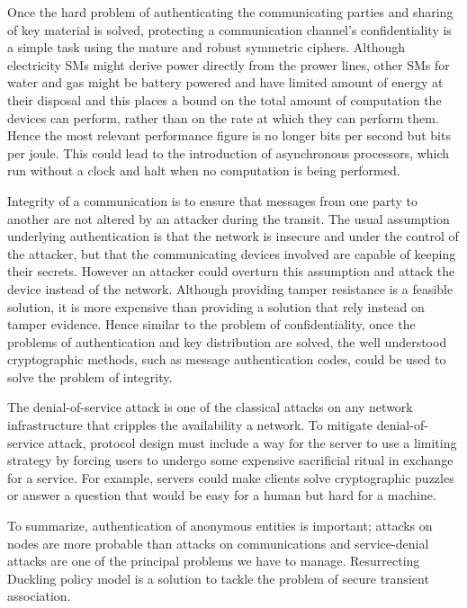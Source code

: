 Once the hard problem of authenticating the communicating parties and sharing of key material is solved, protecting a communication channel's confidentiality is a simple task using the mature and robust symmetric ciphers. Although electricity SMs might derive power directly from the prower lines, other SMs for water and gas might be battery powered and have limited amount of energy at their disposal and this places a bound on the total amount of computation the devices can perform, rather than on the rate at which they can perform them. Hence the most relevant performance figure is no longer bits per second but bits per joule. This could lead to the introduction of asynchronous processors, which run without a clock and halt when no computation is being performed.

Integrity of a communication is to ensure that messages from one party to another are not altered by an attacker during the transit. The usual assumption underlying authentication is that the network is insecure and under the control of the attacker, but that the communicating devices involved are capable of keeping their secrets. However an attacker could overturn this assumption and attack the device instead of the network. Although providing tamper resistance is a feasible solution, it is more expensive than providing a solution that rely instead on tamper evidence. Hence similar to the problem of confidentiality, once the problems of authentication and key distribution are solved, the well understood cryptographic methods, such as message authentication codes, could be used to solve the problem of integrity.

The denial-of-service attack is one of the classical attacks on any network infrastructure that cripples the availability a network. To mitigate denial-of-service attack, protocol design must include a way for the server to use a limiting strategy by forcing users to undergo some expensive sacrificial ritual in exchange for a service. For example, servers could make clients solve cryptographic puzzles or answer a question that would be easy for a human but hard for a machine. 

To summarize, authentication of anonymous entities is important; attacks on nodes are more probable than attacks on communications and service-denial attacks are one of the principal problems we have to manage. Resurrecting Duckling policy model is a solution to tackle the problem of secure transient association.

